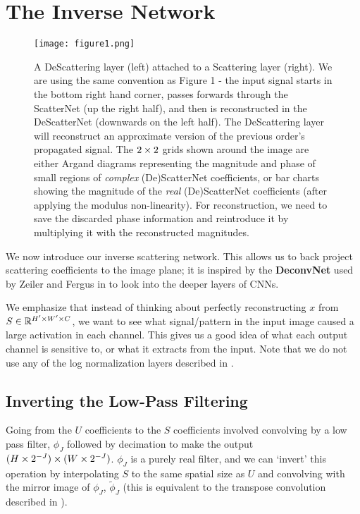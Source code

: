 \section{The Inverse Network}
\label{sec:descatternet}
\begin{figure*}[ht]
  \centering
  \texttt{[image: figure1.png]}
  \caption{A DeScattering layer (left) attached to a Scattering layer (right).
  We are using the same convention as \cite{zeiler_visualizing_2014}
  Figure 1 - the input signal starts in the bottom right hand corner, passes
  forwards through the ScatterNet (up the right half), and then is 
  reconstructed in the DeScatterNet (downwards on the left half).
  The DeScattering layer will reconstruct an approximate version of the previous
  order's propagated signal. The $2\x 2$ grids shown around the image are either Argand
  diagrams representing the magnitude and phase of small regions of
  \emph{complex} (De)ScatterNet
  coefficients, or bar charts showing the magnitude of the \emph{real}
  (De)ScatterNet coefficients (after applying the modulus non-linearity). For reconstruction, we
  need to save the discarded phase information and reintroduce it by multiplying
  it with the reconstructed magnitudes.}
  \label{fig:descat}
\end{figure*}
\label{sec:invscat}
We now introduce our inverse scattering network. This allows us to back project
scattering coefficients to the image plane; it is inspired by the
\textbf{DeconvNet} used by Zeiler and Fergus in
\cite{zeiler_visualizing_2014} to look into the deeper layers of CNNs. 

We emphasize that instead of thinking about perfectly reconstructing $x$ from
$S\in \reals[H'\x W'\x C]$, we want to see what signal/pattern in the input image caused
a large activation in each channel. This gives us a good idea of what each
output channel is sensitive to, or what it extracts from the input. 
Note that we do not use any of the log normalization layers described in
\cite{oyallon_deep_2015, singh_dual-tree_2017}.


\subsection{Inverting the Low-Pass Filtering}
Going from the $U$ coefficients to the $S$ coefficients involved convolving by
a low pass filter, $\phi_J$ followed by decimation to make the output $(H\x
2^{-J})\x (W\x2^{-J})$.  $\phi_J$ is a purely real filter, and we can `invert'
this operation by interpolating $S$ to the same spatial size as $U$ and convolving with
the mirror image of $\phi_J$, $\widetilde{\phi}_J$ (this is equivalent to the
transpose convolution described in \cite{zeiler_visualizing_2014}). 


